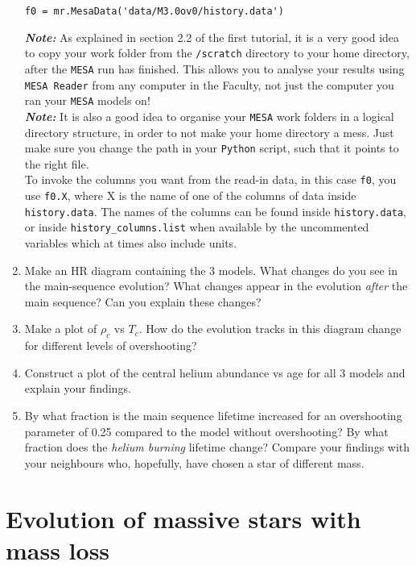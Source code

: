 \documentclass[11pt,a4paper]{article}
\begin{document}
\begin{enumerate}
\begin{verbatim}
f0 = mr.MesaData('data/M3.0ov0/history.data')
\end{verbatim}
\emph{\textbf{Note:}} As explained in section 2.2 of the first tutorial, it is a very good idea to copy your work folder from the \verb|/scratch| directory to your home directory, after the \texttt{MESA} run has finished. This allows you to analyse your results using \texttt{MESA Reader} from any computer in the Faculty, not just the computer you ran your \texttt{MESA} models on! \\[1ex]
\emph{\textbf{Note:}} It is also a good idea to organise your \texttt{MESA} work folders in a logical directory structure, in order to not make your home directory a mess. Just make sure you change the path in your \texttt{Python} script, such that it points to the right file. \\[1ex]
To invoke the columns you want from the read-in data, in this case \texttt{f0}, you use \texttt{f0.X}, where X is the name of one of the columns of data inside \texttt{history.data}. The names of the columns can be found inside \texttt{history.data}, or inside \texttt{history\_columns.list} when available by the uncommented variables which at times also include units. 
\item Make an HR diagram containing the 3 models. What changes do you see in the main-sequence evolution? What changes appear in the evolution \emph{after} the main sequence? Can you explain these changes?
\item Make a plot of $\rho_c$ vs $T_c$. How do the evolution tracks in this diagram change for different levels of overshooting?
\item Construct a plot of the central helium abundance vs age for all 3 models and explain your findings. 
\item By what fraction is the main sequence lifetime increased for an overshooting parameter of 0.25 compared to the model without overshooting? By what fraction does the \emph{helium burning} lifetime change? Compare your findings with your neighbours who, hopefully, have chosen a star of different mass.
\end{enumerate}

\section{Evolution of massive stars with mass loss}
\end{document}
